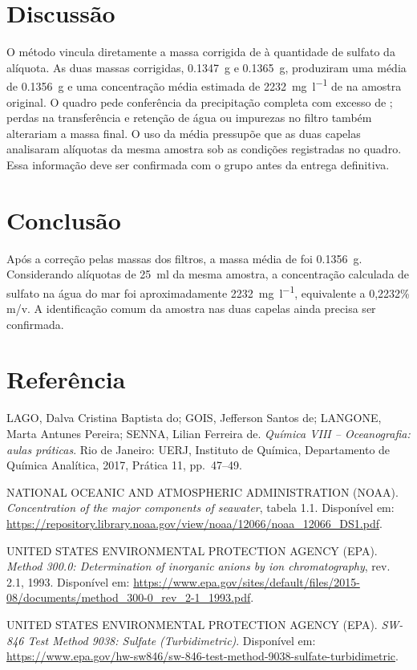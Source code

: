 \documentclass[a4paper,12pt]{article}
\begin{document}
\section{Discussão}
O método vincula diretamente a massa corrigida de  à quantidade de
sulfato da alíquota. As duas massas corrigidas, \SI{0.1347}{\gram} e
\SI{0.1365}{\gram}, produziram uma média de \SI{0.1356}{\gram} e uma
concentração média estimada de \SI{2232}{\milli\gram\per\litre} de
 na amostra original. O quadro pede conferência da
precipitação completa com excesso de ; perdas na transferência
e retenção de água ou impurezas no filtro também alterariam a massa final.
O uso da média pressupõe que as duas capelas analisaram alíquotas da mesma
amostra sob as condições registradas no quadro. Essa informação deve ser
confirmada com o grupo antes da entrega definitiva.

\section{Conclusão}
Após a correção pelas massas dos filtros, a massa média de  foi
\SI{0.1356}{\gram}. Considerando alíquotas de \SI{25}{\milli\litre}
da mesma amostra, a concentração calculada de sulfato na água do mar foi
aproximadamente \SI{2232}{\milli\gram\per\litre}, equivalente a
0,2232\% m/v. A identificação comum da amostra nas duas capelas ainda
precisa ser confirmada.

\section*{Referência}
LAGO, Dalva Cristina Baptista do; GOIS, Jefferson Santos de; LANGONE,
Marta Antunes Pereira; SENNA, Lilian Ferreira de.
\textit{Química VIII -- Oceanografia: aulas práticas}. Rio de Janeiro:
UERJ, Instituto de Química, Departamento de Química Analítica, 2017,
Prática 11, pp.~47--49.

\noindent NATIONAL OCEANIC AND ATMOSPHERIC ADMINISTRATION (NOAA).
\textit{Concentration of the major components of seawater}, tabela 1.1.
Disponível em: \url{https://repository.library.noaa.gov/view/noaa/12066/noaa_12066_DS1.pdf}.

\noindent UNITED STATES ENVIRONMENTAL PROTECTION AGENCY (EPA).
\textit{Method 300.0: Determination of inorganic anions by ion chromatography},
rev. 2.1, 1993. Disponível em:
\url{https://www.epa.gov/sites/default/files/2015-08/documents/method_300-0_rev_2-1_1993.pdf}.

\noindent UNITED STATES ENVIRONMENTAL PROTECTION AGENCY (EPA).
\textit{SW-846 Test Method 9038: Sulfate (Turbidimetric)}.
Disponível em:
\url{https://www.epa.gov/hw-sw846/sw-846-test-method-9038-sulfate-turbidimetric}.
\end{document}
